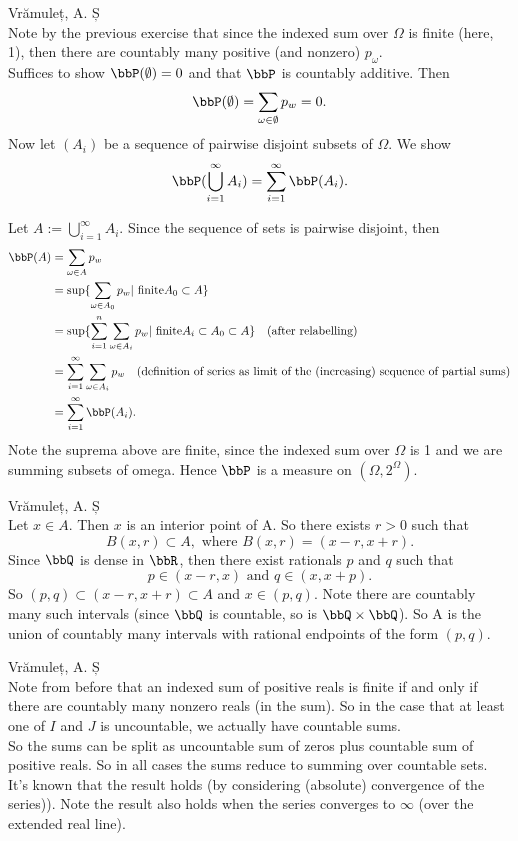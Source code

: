 \begin{solution}[1.13]{Vrămuleț, A. Ș}\\
	Note by the previous exercise that since the indexed sum over $\Omega$ is finite (here, 1), then there are countably many positive (and nonzero) $p_{\omega}$.\\
	Suffices to show $\bbP(\emptyset) = 0$ and that $\bbP$ is countably additive. 
	Then 
	\[
	\bbP(\emptyset) = \sum_{\omega \in \emptyset} p_w = 0.
	\]
	Now let $(A_i)$ be a sequence of pairwise disjoint subsets of $\Omega$. We show 
	\[
	\bbP( \bigcup_{i = 1}^{\infty} A_i) = \sum_{i = 1}^\infty \bbP(A_i).
	 \]
   
   Let $A := \bigcup_{i = 1}^{\infty} A_i$. Since the sequence of sets is pairwise disjoint, then
   \begin{align*}
   \bbP(A) &= \sum_{\omega \in A} p_w \\
   			&= \sup\{\sum_{\omega \in A_0} p_w | \text{ finite} A_0 \subset A \} \\
   			&= \sup\{\sum_{i = 1}^n \sum_{\omega \in A_i} p_w | \text{ finite} A_i \subset A_0 \subset A  \} \quad \text{(after relabelling)}   \\
   			&= \sum_{i = 1}^{\infty} \sum_{\omega \in A_i} p_w \quad \text{(definition of series as limit of the (increasing) sequence of partial sums)} \\
   			&= \sum_{i = 1}^{\infty} \bbP(A_i).
   \end{align*}
   Note the suprema above are finite, since the indexed sum over $\Omega$ is 1 and we are summing subsets of omega. Hence $\bbP$ is a measure on $(\Omega, 2^{\Omega})$.
\end{solution}

\begin{solution}[1.14]{Vrămuleț, A. Ș}\\
Let $x \in A$. Then $x$ is an interior point of A. So there exists $r > 0$ such that 
\[
B(x,r) \subset A, \text{ where } B(x,r) = (x-r,x+r).
\]
Since $\bbQ$ is dense in $\bbR$, then there exist rationals $p$ and $q$ such that
\[
p \in (x-r,x) \text{ and } q \in (x,x+p).
\]
So $(p,q) \subset (x-r,x+r) \subset A$ and $x \in (p,q)$. Note there are countably many such intervals (since $\bbQ$ is countable, so is $\bbQ \times \bbQ$). So A is the union of countably many intervals with rational endpoints of the form $(p,q)$.
\end{solution}

\begin{solution}[1.15]{Vrămuleț, A. Ș}\\
Note from before that an indexed sum of positive reals is finite if and only if there are countably many nonzero reals (in the sum). So in the case that at least one of $I$ and $J$ is uncountable, we actually have countable sums. \\

\noindent So the sums can be split as uncountable sum of zeros plus countable sum of positive reals. So in all cases the sums reduce to summing over countable sets.
It's known that the result holds (by considering (absolute) convergence of the series)). Note the result also holds when the series converges to $\infty$ (over the extended real line).
\end{solution}